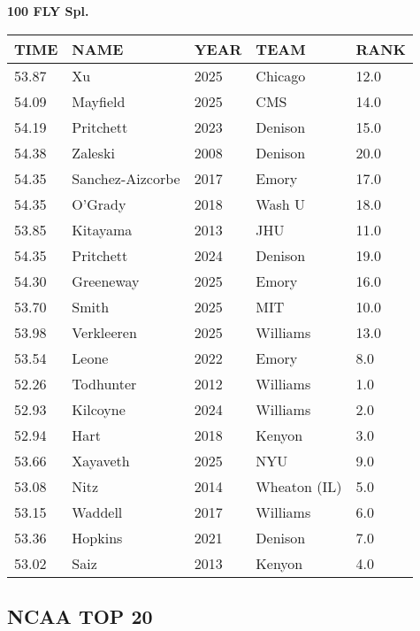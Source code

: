 \begin{table}[H]
\centering
\begin{minipage}[t]{0.6\textwidth}
\centering
\textbf{100 FLY Spl.}\\[0.1cm]
\begin{tabular}{@{}p{1.8cm}p{2.8cm}p{1.2cm}p{1.4cm}p{0.8cm}@{}}
\hline
    \textbf{TIME} & \textbf{NAME} & \textbf{YEAR} & \textbf{TEAM} & \textbf{RANK} \\
\hline
    53.87 & Xu & 2025 & Chicago & 12.0 \\
    54.09 & Mayfield & 2025 & CMS & 14.0 \\
    54.19 & Pritchett & 2023 & Denison & 15.0 \\
    54.38 & Zaleski & 2008 & Denison & 20.0 \\
    54.35 & Sanchez-Aizcorbe & 2017 & Emory & 17.0 \\
    54.35 & O'Grady & 2018 & Wash U & 18.0 \\
    53.85 & Kitayama & 2013 & JHU & 11.0 \\
    54.35 & Pritchett & 2024 & Denison & 19.0 \\
    54.30 & Greeneway & 2025 & Emory & 16.0 \\
    53.70 & Smith & 2025 & MIT & 10.0 \\
    53.98 & Verkleeren & 2025 & Williams & 13.0 \\
    53.54 & Leone & 2022 & Emory & 8.0 \\
    52.26 & Todhunter & 2012 & Williams & 1.0 \\
    52.93 & Kilcoyne & 2024 & Williams & 2.0 \\
    52.94 & Hart & 2018 & Kenyon & 3.0 \\
    53.66 & Xayaveth & 2025 & NYU & 9.0 \\
    53.08 & Nitz & 2014 & Wheaton (IL) & 5.0 \\
    53.15 & Waddell & 2017 & Williams & 6.0 \\
    53.36 & Hopkins & 2021 & Denison & 7.0 \\
    53.02 & Saiz & 2013 & Kenyon & 4.0 \\
\hline
\end{tabular}
\end{minipage}
\end{table}


\newpage

\subsection{NCAA TOP 20}
